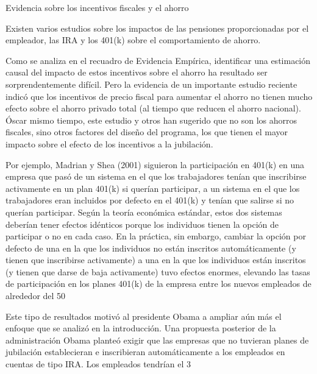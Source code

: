 \documentclass[10pt,a4paper]{article}
\begin{document}
Evidencia sobre los incentivos fiscales y el ahorro

Existen varios estudios sobre los impactos de las pensiones proporcionadas por el empleador, las IRA y los 401(k) sobre el comportamiento de ahorro.

Como se analiza en el recuadro de Evidencia Empírica, identificar una estimación causal del impacto de estos incentivos sobre el ahorro ha resultado ser sorprendentemente difícil. Pero la evidencia de un importante estudio reciente indicó que los incentivos de precio fiscal para aumentar el ahorro no tienen mucho efecto sobre el ahorro privado total (al tiempo que reducen el ahorro nacional). Óscar mismo tiempo, este estudio y otros han sugerido que no son los ahorros fiscales, sino otros factores del diseño del programa, los que tienen el mayor impacto sobre el efecto de los incentivos a la jubilación.

Por ejemplo, Madrian y Shea (2001) siguieron la participación en 401(k) en una empresa que pasó de un sistema en el que los trabajadores tenían que inscribirse activamente en un plan 401(k) si querían participar, a un sistema en el que los trabajadores eran incluidos por defecto en el 401(k) y tenían que salirse si no querían participar. Según la teoría económica estándar, estos dos sistemas deberían tener efectos idénticos porque los individuos tienen la opción de participar o no en cada caso. En la práctica, sin embargo, cambiar la opción por defecto de una en la que los individuos no están inscritos automáticamente (y tienen que inscribirse activamente) a una en la que los individuos están inscritos (y tienen que darse de baja activamente) tuvo efectos enormes, elevando las tasas de participación en los planes 401(k) de la empresa entre los nuevos empleados de alrededor del 50 %

Este tipo de resultados motivó al presidente Obama a ampliar aún más el enfoque que se analizó en la introducción. Una propuesta posterior de la administración Obama planteó exigir que las empresas que no tuvieran planes de jubilación establecieran e inscribieran automáticamente a los empleados en cuentas de tipo IRA. Los empleados tendrían el 3 %
\end{document}
